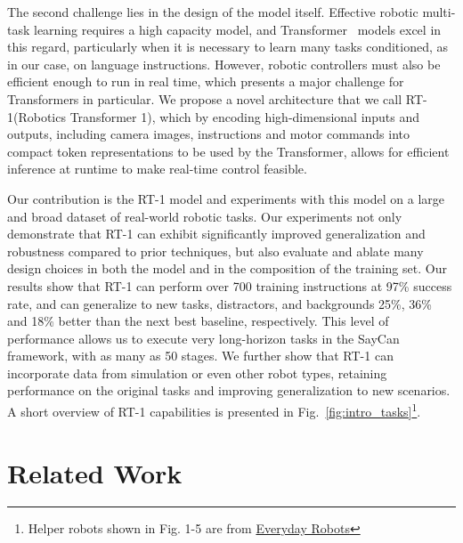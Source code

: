 \documentclass{article} %
\newcommand{\algname}{RT-1\xspace}
\newcommand{\algfullname}{Robotics Transformer 1\xspace}
\begin{document}
The second challenge lies in the design of the model itself. Effective robotic multi-task learning requires a high capacity model, and Transformer~\citep{vaswani2017attention} models excel in this regard, particularly when it is necessary to learn many tasks conditioned, as in our case, on language instructions. However, robotic controllers must also be efficient enough to run in real time, which presents a major challenge for Transformers in particular. We propose a novel architecture that we call \algname (\algfullname), which 
by encoding high-dimensional inputs and outputs, including camera images, instructions and motor commands into compact token representations to be used by the Transformer,
allows for efficient inference at runtime to make real-time control feasible.


Our contribution is the RT-1 model and experiments with this model on a large and broad dataset of real-world robotic tasks. Our experiments not only demonstrate that RT-1 can exhibit significantly improved generalization and robustness compared to prior techniques, but also evaluate and ablate many design choices in both the model and in the composition of the training set.
Our results show that \algname can perform over 700 training instructions at 97\% success rate, and can generalize to new tasks, distractors, and backgrounds 25\%, 36\% and 18\% better than the next best baseline, respectively. This level of performance allows us to execute very long-horizon tasks in the SayCan~\citep{ahn2022can} framework, with as many as 50 stages. We further show that \algname can incorporate data from simulation or even other robot types, retaining performance on the original tasks and improving generalization to new scenarios. A short overview of \algname capabilities is presented in Fig.~\ref{fig:intro_tasks}\footnote{Helper robots shown in Fig. 1-5 are from \href{http://www.everydayrobots.com}{Everyday Robots}}.

\section{Related Work}\label{sec:related}
\end{document}
